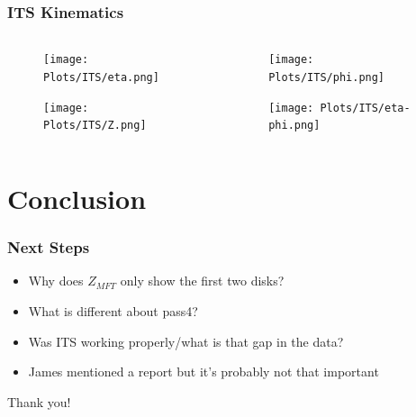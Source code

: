 \documentclass[11pt]{beamer}
\begin{document}
\begin{frame}
    \frametitle{ITS Kinematics}

    \begin{columns}[c]
        \begin{column}{0.5\textwidth}
            \begin{figure}
                \begin{center}
                    \texttt{[image: Plots/ITS/eta.png]}
                \end{center}
            \end{figure}
            \begin{figure}
                \begin{center}
                    \texttt{[image: Plots/ITS/Z.png]}
                \end{center}
            \end{figure}
        \end{column}

        \begin{column}{0.5\textwidth}
            \begin{figure}
                \begin{center}
                    \texttt{[image: Plots/ITS/phi.png]}
                \end{center}
            \end{figure}
            \begin{figure}
                \begin{center}
                    \texttt{[image: Plots/ITS/eta-phi.png]}
                \end{center}
            \end{figure}
        \end{column}
    \end{columns}

\end{frame}

\section{Conclusion}

\begin{frame}
    \frametitle{Next Steps}

    \begin{itemize}
        \item Why does $Z_{MFT}$ only show the first two disks?
        \item What is different about pass4?
        \item Was ITS working properly/what is that gap in the data?
        \item James mentioned a report but it's probably not that important
    \end{itemize}

\end{frame}

\begin{frame}
    \begin{center}
        {\Huge Thank you!}
    \end{center}

\end{frame}
\end{document}
